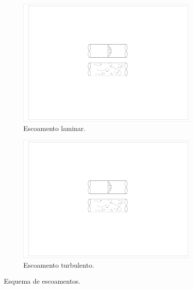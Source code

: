 \documentclass[_ArquivoPrincipal.tex]{subfiles}
\begin{document}
\begin{figure}[h]
    \centering
    \begin{subfigure}{.45\textwidth}
        \centering
        \includegraphics[width=\linewidth]{Figuras/EscLaminar.pdf}
        \caption{Escoamento laminar.}
        \label{fig:EscLaminar}
      \end{subfigure}
      \begin{subfigure}{.45\textwidth}
        \centering
        \includegraphics[width=\linewidth]{Figuras/EscTurbulento.pdf}
        \caption{Escoamento turbulento.}
        \label{fig:EscTurbulento}
      \end{subfigure}
    \caption{Esquema de escoamentos.\label{fig:Escoamentos}}
\end{figure}

\end{document}
